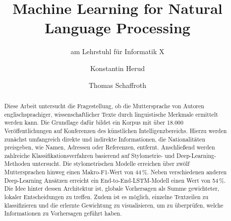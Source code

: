 \documentclass[bachelor,german]{info1thesis}
\title{Machine Learning for Natural Language Processing} %
\subtitle{am Lehrstuhl für Informatik X}
\author{Konstantin Herud\and Thomas Schaffroth} %
\begin{document}

\begin{abstract}
Diese Arbeit untersucht die Fragestellung, ob die Muttersprache von Autoren englischsprachiger, wissenschaftlicher Texte durch linguistische Merkmale ermittelt werden kann. Die Grundlage dafür bildet ein Korpus mit über 18.000 Veröffentlichungen auf Konferenzen des künstlichen Intelligenzbereichs. Hierzu werden zunächst umfangreich direkte und indirekte Informationen, die Nationalitäten preisgeben, wie Namen, Adressen oder Referenzen, entfernt. Anschließend werden zahlreiche Klassifikationsverfahren basierend auf Stylometrie- und Deep-Learning-Methoden untersucht. Die stylometrischen Modelle erreichen über zwölf Muttersprachen hinweg einen Makro-F1-Wert von 44\,\%. Neben verschiedenen anderen Deep-Learning Ansätzen erreicht ein End-to-End-LSTM-Modell einen Wert von 54\,\%. Die Idee hinter dessen Architektur ist, globale Vorhersagen als Summe gewichteter, lokaler Entscheidungen zu treffen. Zudem ist es möglich, einzelne Textzeilen zu klassifizieren und die erlernte Gewichtung zu visualisieren, um zu überprüfen, welche Informationen zu Vorhersagen geführt haben.
\end{abstract}

\thesistableofcontents
\end{document}
